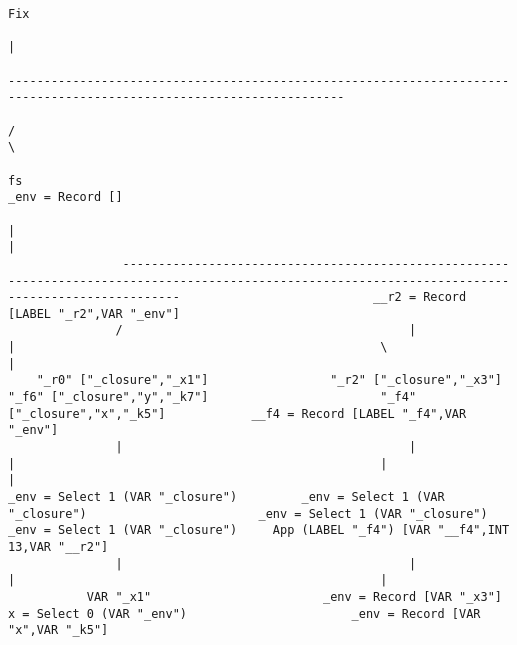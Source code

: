 \begin{landscape}
\begin{lstlisting}[basicstyle=\fontsize{6.25}{7.25}\selectfont\ttfamily]
                                                                                                                   Fix
                                                                                                                    |
                                                                                            ---------------------------------------------------------------------------------------------------------------------
                                                                                           /                                                                                                                     \
                                                                                           fs                                                                                                             _env = Record []
                                                                                           |                                                                                                                     |
                ----------------------------------------------------------------------------------------------------------------------------------------------------                           __r2 = Record [LABEL "_r2",VAR "_env"]
               /                                        |                                                       |                                                   \                                            |
    "_r0" ["_closure","_x1"]                 "_r2" ["_closure","_x3"]                              "_f6" ["_closure","y","_k7"]                        "_f4" ["_closure","x","_k5"]            __f4 = Record [LABEL "_f4",VAR "_env"]
               |                                        |                                                       |                                                   |                                            |
_env = Select 1 (VAR "_closure")         _env = Select 1 (VAR "_closure")                        _env = Select 1 (VAR "_closure")                    _env = Select 1 (VAR "_closure")     App (LABEL "_f4") [VAR "__f4",INT 13,VAR "__r2"]
               |                                        |                                                       |                                                   |
           VAR "_x1"                        _env = Record [VAR "_x3"]                               x = Select 0 (VAR "_env")                       _env = Record [VAR "x",VAR "_k5"]

\end{lstlisting}
\end{landscape}
